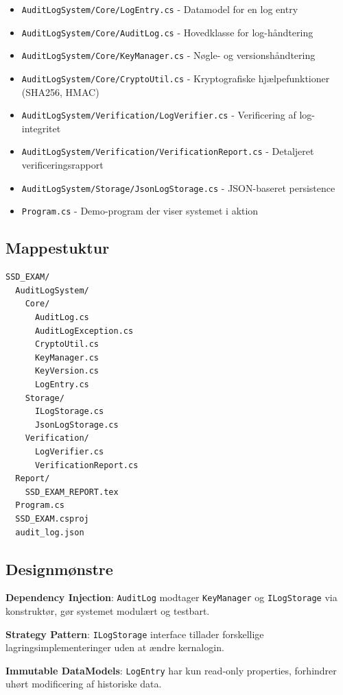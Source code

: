 \documentclass[12pt, a4paper, danish]{article}
\begin{document}
\begin{itemize}
    \item \texttt{AuditLogSystem/Core/LogEntry.cs} - Datamodel for en log entry
    \item \texttt{AuditLogSystem/Core/AuditLog.cs} - Hovedklasse for log-håndtering
    \item \texttt{AuditLogSystem/Core/KeyManager.cs} - Nøgle- og versionshåndtering
    \item \texttt{AuditLogSystem/Core/CryptoUtil.cs} - Kryptografiske hjælpefunktioner (SHA256, HMAC)
    \item \texttt{AuditLogSystem/Verification/LogVerifier.cs} - Verificering af log-integritet
    \item \texttt{AuditLogSystem/Verification/VerificationReport.cs} - Detaljeret verificeringsrapport
    \item \texttt{AuditLogSystem/Storage/JsonLogStorage.cs} - JSON-baseret persistence
    \item \texttt{Program.cs} - Demo-program der viser systemet i aktion
\end{itemize}

\subsection{Mappestuktur}

\begin{verbatim}
SSD_EXAM/
  AuditLogSystem/
    Core/
      AuditLog.cs
      AuditLogException.cs
      CryptoUtil.cs
      KeyManager.cs
      KeyVersion.cs
      LogEntry.cs
    Storage/
      ILogStorage.cs
      JsonLogStorage.cs
    Verification/
      LogVerifier.cs
      VerificationReport.cs
  Report/
    SSD_EXAM_REPORT.tex
  Program.cs
  SSD_EXAM.csproj
  audit_log.json
\end{verbatim}

\subsection{Designmønstre}

\textbf{Dependency Injection}: \texttt{AuditLog} modtager \texttt{KeyManager} og \texttt{ILogStorage} via konstruktør, gør systemet modulært og testbart.

\textbf{Strategy Pattern}: \texttt{ILogStorage} interface tillader forskellige lagringsimplementeringer uden at ændre kernalogin.

\textbf{Immutable DataModels}: \texttt{LogEntry} har kun read-only properties, forhindrer uhørt modificering af historiske data.
\end{document}
